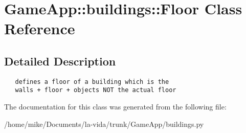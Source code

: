 \hypertarget{classGameApp_1_1buildings_1_1Floor}{
\section{GameApp::buildings::Floor Class Reference}
\label{classGameApp_1_1buildings_1_1Floor}
}


\subsection{Detailed Description}


\footnotesize\begin{verbatim}
   defines a floor of a building which is the 
   walls + floor + objects NOT the actual floor
\end{verbatim}
\normalsize
 

The documentation for this class was generated from the following file:\begin{CompactItemize}
\item 
/home/mike/Documents/la-vida/trunk/GameApp/buildings.py\end{CompactItemize}
